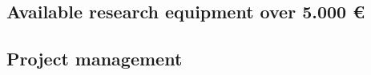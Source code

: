 \documentclass[11pt,a4paper]{article}
\begin{document}
\subsection{Available research equipment over 5.000 €}

\subsection{Project management}
\end{document}
